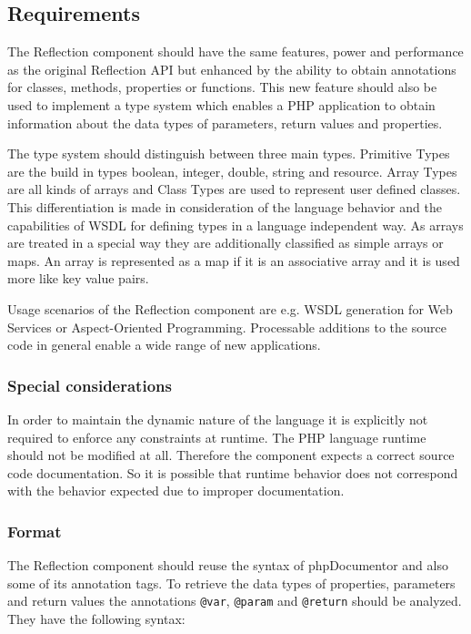 \documentclass[10pt,final,a4paper,oneside]{article}
\begin{document}
\subsection{Requirements}\label{subsec:ReflectionRequirements}
The Reflection component should have
the same features, power and performance
as the original Reflection API
but enhanced by the ability to obtain annotations
for classes, methods, properties or functions.
This new feature should also be used
to implement a type system
which enables a PHP application to obtain information
about the data types of parameters, return values and properties.

The type system should distinguish between three main types.
Primitive Types are the build in types boolean, integer, double, string and resource.
Array Types are all kinds of arrays and
Class Types are used to represent user defined classes.
This differentiation is made
in consideration of the language behavior
and the capabilities of WSDL for defining types
in a language independent way.
As arrays are treated in a special way
they are additionally classified as simple arrays or maps.
An array is represented as a map if it is an associative array
and it is used more like key value pairs.

Usage scenarios of the Reflection component are
e.g. WSDL generation for Web Services
or Aspect-Oriented Programming.
Processable additions to the source code in general
enable a wide range of new applications.


\subsubsection{Special considerations}
In order to maintain the dynamic nature of the language
it is explicitly not required
to enforce any constraints at runtime.
The PHP language runtime should not be modified at all.
Therefore the component expects a correct source code documentation.
So it is possible that runtime behavior does not correspond
with the behavior expected due to improper documentation.

\subsubsection{Format}\label{subsubsec:ReflectionFormat}
The Reflection component should reuse the syntax
of phpDocumentor \cite{phpDocumentor}
and also some of its annotation tags.
To retrieve the data types of properties,
parameters and return values the annotations
\verb|@var|,
\verb|@param| and
\verb|@return| should be analyzed.
They have the following syntax:
\end{document}
